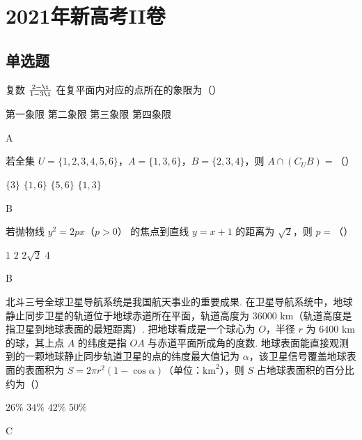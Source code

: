 
\chapter{2021年新高考II卷}

\section{单选题}

\begin{problem}
复数 \(\frac{2-\i}{1-3\i}\) 在复平面内对应的点所在的象限为（\quad）

\choices
    {第一象限}
    {第二象限}
    {第三象限}
    {第四象限}

\begin{answer}
A
\end{answer}
\end{problem}


\begin{problem}
若全集 \(U=\{1,2,3,4,5,6\}\)，\(A=\{1,3,6\}\)，\(B=\{2,3,4\}\)，则 \(A\cap \left( C_U B \right)=\)（\quad）

\choices
    {\(\{3\}\)}
    {\(\{1,6\}\)}
    {\(\{5,6\}\)}
    {\(\{1,3\}\)}

\begin{answer}
B
\end{answer}
\end{problem}


\begin{problem}
若抛物线 \(y^2=2px\)（\(p>0\)） 的焦点到直线 \(y=x+1\) 的距离为 \(\sqrt2\)，则 \(p=\)（\quad）

\choices
    {\(1\)}
    {\(2\)}
    {\(2\sqrt2\)}
    {\(4\)}

\begin{answer}
B
\end{answer}
\end{problem}


\begin{problem}
北斗三号全球卫星导航系统是我国航天事业的重要成果. 在卫星导航系统中，地球静止同步卫星的轨道位于地球赤道所在平面，轨道高度为 \(36000\text{ km}\)（轨道高度是指卫星到地球表面的最短距离）. 把地球看成是一个球心为 \(O\)，半径 \(r\) 为 \(6400\text{ km}\) 的球，其上点 \(A\) 的纬度是指 \(OA\) 与赤道平面所成角的度数. 地球表面能直接观测到的一颗地球静止同步轨道卫星的点的纬度最大值记为 \(\alpha\)，该卫星信号覆盖地球表面的表面积为 \(S=2\pi r^2\left( 1-\cos \alpha \right)\)（单位：\(\text{km}^2\)），则 \(S\) 占地球表面积的百分比约为（\quad）

\choices
    {\(26\%\)}
    {\(34\%\)}
    {\(42\%\)}
    {\(50\%\)}

\begin{answer}
C
\end{answer}
\end{problem}


